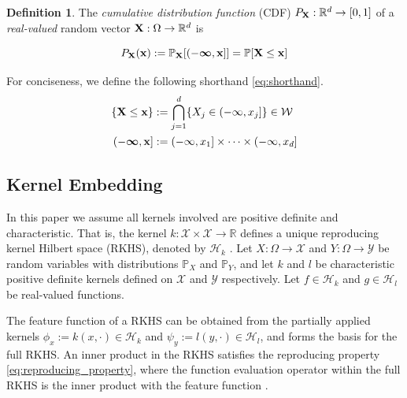 \documentclass[twoside]{article} \usepackage{aistats2017}
\theoremstyle{definition}
\newtheorem{definition}{Definition}[section]
\theoremstyle{theorem}
\newcommand{\rv}[1]{{#1}}
\newcommand{\Hk}{\mathcal{H}_{k}}
\newcommand{\Hl}{\mathcal{H}_{l}}
\begin{document}
	\begin{definition} \label{def:cdf}
		\citep{bauer1981probability}
		The \textit{cumulative distribution function} (CDF) $P_{\bvec{\rv{X}}} : \mathbb{R}^{d} \to [0, 1]$ of a \textit{real-valued} random vector $\bvec{\rv{X}} : \Omega \to \mathbb{R}^{d}$ is
		
		\begin{equation}
				P_{\bvec{\rv{X}}}(\bvec{x}) := \mathbb{P}_{\bvec{\rv{X}}}[(-\bm{\infty}, \bvec{x}]] = \mathbb{P}[\bvec{\rv{X}} \leq \bvec{x}]
		\label{eq:cdf}
		\end{equation}

		For conciseness, we define the following shorthand \eqref{eq:shorthand}. 
		\begin{equation}
			\begin{aligned}
				\{\bvec{\rv{X}} \leq \bvec{x}\} &:= \bigcap\limits_{j = 1}^{d} \{\rv{X}_{j} \in (-\infty, x_{j}]\} \in \mathcal{W} \\
				(-\bm{\infty}, \bvec{x}] &:= (-\infty, x_{1}] \times \dots \times (-\infty, x_{d}] \\
			\end{aligned}
		\label{eq:shorthand}
		\end{equation}
	\end{definition}
		
	\subsection{Kernel Embedding}
	\label{sec:background:kernel_embedding}
	

		In this paper we assume all kernels involved are positive definite and characteristic. That is, the kernel $k : \mathcal{X} \times \mathcal{X} \to \mathbb{R}$ defines a unique reproducing kernel Hilbert space (RKHS), denoted by $\mathcal{H}_{k}$ \citep{fukumizu2004dimensionality}. Let $\rv{X} : \Omega \to \mathcal{X}$ and $\rv{Y} : \Omega \to \mathcal{Y}$ be random variables with distributions $\mathbb{P}_{\rv{X}}$ and $\mathbb{P}_{\rv{Y}}$, and let $k$ and $l$ be characteristic positive definite kernels defined on $\mathcal{X}$ and $\mathcal{Y}$ respectively. Let $f \in \Hk$ and $g \in \Hl$ be real-valued functions.
		
		The feature function of a RKHS can be obtained from the partially applied kernels $\phi_{x} := k(x, \cdot) \in \Hk$ and $\psi_{y} := l(y, \cdot) \in \Hl$, and forms the basis for the full RKHS. An inner product in the RKHS satisfies the reproducing property \eqref{eq:reproducing_property}, where the function evaluation operator within the full RKHS is the inner product with the feature function \citep{muandet2016kernel}.
\end{document}
